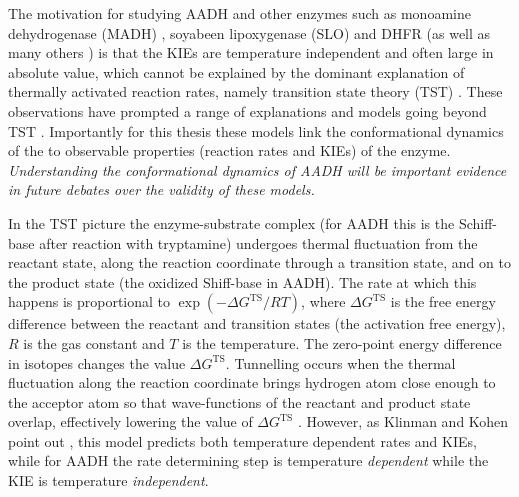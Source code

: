The motivation for studying AADH and other enzymes such as monoamine dehydrogenase (MADH) \cite{brooksDeuteriumKineticIsotope1993, basranEnzymaticHTransferRequires1999},  soyabeen lipoxygenase (SLO) \cite{glickmanExtremelyLargeIsotope1994, knappTemperatureDependentIsotopeEffects2002} and  DHFR \cite{sikorskiTunnelingCoupledMotion2004, loveridgeSolventEffectsCatalysis2010a} (as well as many others \cite{puMultidimensionalTunnelingRecrossing2006}) is that the KIEs are temperature independent and often large in absolute value, which cannot be explained \cite{klinmanHydrogenTunnelingLinks2013} by the dominant explanation of thermally activated reaction rates, namely transition state theory (TST) \cite{garciavilocaHowEnzymesWork2004} . These observations have prompted a range of explanations and models going beyond TST \cite{masgrau2004hydrogen, brunoVibrationallyEnhancedTunneling1992, borgisCurveCrossingFormulation1996, antoniouLargeKineticIsotope1997, klinmanbeyond2009}.  Importantly for this thesis these models  link the conformational dynamics of the to observable properties (reaction rates and KIEs) of the enzyme. \emph{Understanding the conformational dynamics of AADH will be important evidence in future debates over the validity of these models.}  

In the TST picture the enzyme-substrate complex (for AADH this is the Schiff-base after reaction with tryptamine) undergoes thermal fluctuation from the reactant state,  along the reaction coordinate through a transition state, and on to the product state (the oxidized Shiff-base in AADH). The rate at which this happens is proportional to $\exp{(-\Delta G^{\mathrm{TS}}/RT)}$, where  $\Delta G^{\mathrm{TS}}$ is the free energy difference between the reactant and transition states (the activation free energy), $R$ is the gas constant and $T$ is the temperature. The zero-point energy difference in isotopes changes the value $\Delta G^{\mathrm{TS}}$. Tunnelling occurs when the thermal fluctuation along the reaction coordinate brings hydrogen atom close enough to the acceptor atom so that wave-functions of the reactant and product state overlap, effectively lowering the value of $\Delta G^{\mathrm{TS}}$ \cite{puMultidimensionalTunnelingRecrossing2006}.  However, as Klinman and Kohen point out \cite{klinmanHydrogenTunnelingLinks2013}, this model predicts both temperature dependent rates and KIEs, while for AADH the rate determining step is temperature \emph{dependent} while the KIE is temperature \emph{independent}. 

